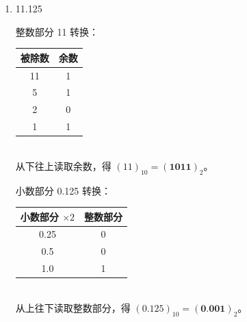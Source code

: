 \documentclass[10pt, a4paper]{article}
\begin{document}
{\begin{enumerate}
    \item 11.125 \\
    \begin{minipage}[t]{0.48\textwidth}
		整数部分 11 转换：\\
        \begin{tabular}{|c|c|}
            \hline
            被除数 & 余数 \\ \hline
            11 & 1 \\ \hline
            5  & 1 \\ \hline
            2  & 0 \\ \hline
            1  & 1 \\ \hline
        \end{tabular}\\
        从下往上读取余数，得 $(11)_{10}=(\textbf{1011})_2$。
    \end{minipage}
    \hfill
    \begin{minipage}[t]{0.48\textwidth}
        小数部分 0.125 转换：\\
        \begin{tabular}{|c|c|}
            \hline
            小数部分 $\times 2$ & 整数部分 \\ \hline
            0.25 & 0 \\ \hline
            0.5  & 0 \\ \hline
            1.0  & 1 \\ \hline
        \end{tabular}\\
        从上往下读取整数部分，得 $(0.125)_{10}=(\textbf{0.001})_2$。
    \end{minipage}
    
    

\end{enumerate}}
\end{document}
